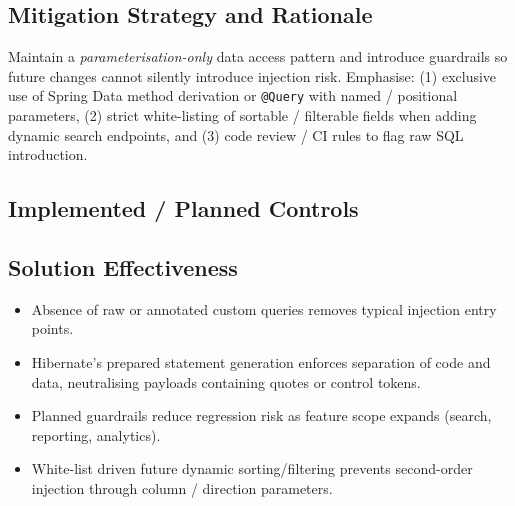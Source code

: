 \documentclass[]{UCD_CS_FYP_Report}
\begin{document}
\subsection*{Mitigation Strategy and Rationale}
Maintain a \textit{parameterisation-only} data access pattern and introduce guardrails so future changes cannot silently introduce injection risk. Emphasise: (1) exclusive use of Spring Data method derivation or \texttt{@Query} with named / positional parameters, (2) strict white-listing of sortable / filterable fields when adding dynamic search endpoints, and (3) code review / CI rules to flag raw SQL introduction.

\subsection*{Implemented / Planned Controls}

\subsection*{Solution Effectiveness}
\begin{itemize}
 \item Absence of raw or annotated custom queries removes typical injection entry points.
 \item Hibernate's prepared statement generation enforces separation of code and data, neutralising payloads containing quotes or control tokens.
 \item Planned guardrails reduce regression risk as feature scope expands (search, reporting, analytics).
 \item White-list driven future dynamic sorting/filtering prevents second-order injection through column / direction parameters.
\end{itemize}
\end{document}
